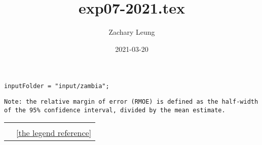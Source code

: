 \documentclass[12pt]{article}
\title{exp07-2021.tex}
\author{Zachary Leung}
\date{2021-03-20}
\begin{document}
\maketitle

\begin{verbatim}
inputFolder = "input/zambia";
\end{verbatim}

\begin{verbatim}
Note: the relative margin of error (RMOE) is defined as the half-width
of the 95% confidence interval, divided by the mean estimate.
\end{verbatim}

\vspace{10mm}

\pgfplotsset{width=10cm,height=9cm}

\begin{center}
\begin{tabular}{MM}

&

\\

&
\ref{the legend reference}
\end{tabular}
\end{center}


\end{document}
